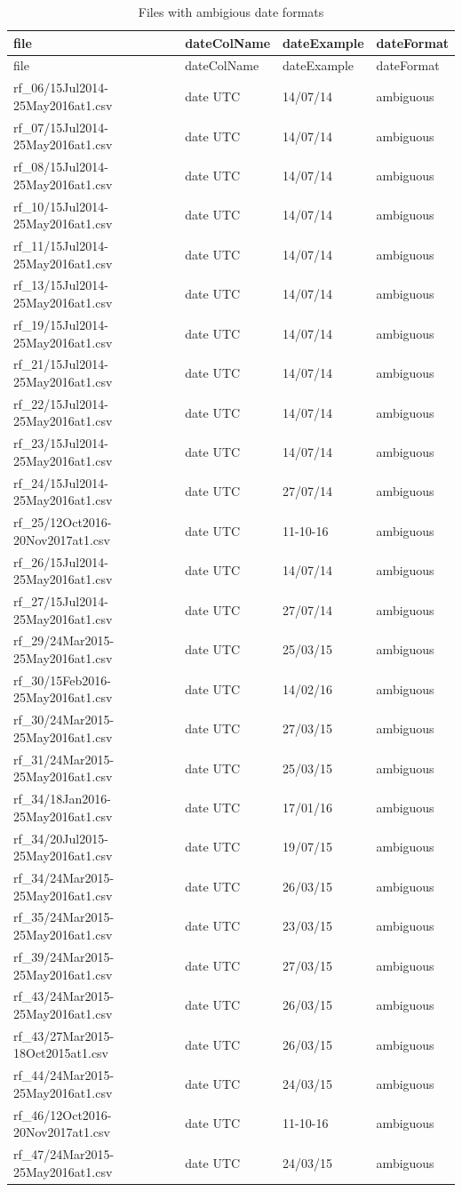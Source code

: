 \documentclass[]{article}
\begin{document}
\begin{longtable}[]{@{}llll@{}}
\caption{Files with ambigious date formats}\tabularnewline
\toprule
file & dateColName & dateExample & dateFormat\tabularnewline
\midrule
\endfirsthead
\toprule
file & dateColName & dateExample & dateFormat\tabularnewline
\midrule
\endhead
rf\_06/15Jul2014-25May2016at1.csv & date UTC & 14/07/14 &
ambiguous\tabularnewline
rf\_07/15Jul2014-25May2016at1.csv & date UTC & 14/07/14 &
ambiguous\tabularnewline
rf\_08/15Jul2014-25May2016at1.csv & date UTC & 14/07/14 &
ambiguous\tabularnewline
rf\_10/15Jul2014-25May2016at1.csv & date UTC & 14/07/14 &
ambiguous\tabularnewline
rf\_11/15Jul2014-25May2016at1.csv & date UTC & 14/07/14 &
ambiguous\tabularnewline
rf\_13/15Jul2014-25May2016at1.csv & date UTC & 14/07/14 &
ambiguous\tabularnewline
rf\_19/15Jul2014-25May2016at1.csv & date UTC & 14/07/14 &
ambiguous\tabularnewline
rf\_21/15Jul2014-25May2016at1.csv & date UTC & 14/07/14 &
ambiguous\tabularnewline
rf\_22/15Jul2014-25May2016at1.csv & date UTC & 14/07/14 &
ambiguous\tabularnewline
rf\_23/15Jul2014-25May2016at1.csv & date UTC & 14/07/14 &
ambiguous\tabularnewline
rf\_24/15Jul2014-25May2016at1.csv & date UTC & 27/07/14 &
ambiguous\tabularnewline
rf\_25/12Oct2016-20Nov2017at1.csv & date UTC & 11-10-16 &
ambiguous\tabularnewline
rf\_26/15Jul2014-25May2016at1.csv & date UTC & 14/07/14 &
ambiguous\tabularnewline
rf\_27/15Jul2014-25May2016at1.csv & date UTC & 27/07/14 &
ambiguous\tabularnewline
rf\_29/24Mar2015-25May2016at1.csv & date UTC & 25/03/15 &
ambiguous\tabularnewline
rf\_30/15Feb2016-25May2016at1.csv & date UTC & 14/02/16 &
ambiguous\tabularnewline
rf\_30/24Mar2015-25May2016at1.csv & date UTC & 27/03/15 &
ambiguous\tabularnewline
rf\_31/24Mar2015-25May2016at1.csv & date UTC & 25/03/15 &
ambiguous\tabularnewline
rf\_34/18Jan2016-25May2016at1.csv & date UTC & 17/01/16 &
ambiguous\tabularnewline
rf\_34/20Jul2015-25May2016at1.csv & date UTC & 19/07/15 &
ambiguous\tabularnewline
rf\_34/24Mar2015-25May2016at1.csv & date UTC & 26/03/15 &
ambiguous\tabularnewline
rf\_35/24Mar2015-25May2016at1.csv & date UTC & 23/03/15 &
ambiguous\tabularnewline
rf\_39/24Mar2015-25May2016at1.csv & date UTC & 27/03/15 &
ambiguous\tabularnewline
rf\_43/24Mar2015-25May2016at1.csv & date UTC & 26/03/15 &
ambiguous\tabularnewline
rf\_43/27Mar2015-18Oct2015at1.csv & date UTC & 26/03/15 &
ambiguous\tabularnewline
rf\_44/24Mar2015-25May2016at1.csv & date UTC & 24/03/15 &
ambiguous\tabularnewline
rf\_46/12Oct2016-20Nov2017at1.csv & date UTC & 11-10-16 &
ambiguous\tabularnewline
rf\_47/24Mar2015-25May2016at1.csv & date UTC & 24/03/15 &
ambiguous\tabularnewline
\bottomrule
\end{longtable}
\end{document}
